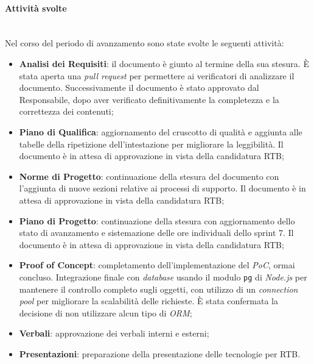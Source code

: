 \documentclass[10pt, letterpaper]{article}
\newcommand{\trisubsection}[1]{\paragraph{#1}\mbox{}\\}
\begin{document}
\trisubsection{Attività svolte}
Nel corso del periodo di avanzamento sono state svolte le seguenti attività:
\begin{itemize}
    \item \textbf{Analisi dei Requisiti}: il documento è giunto al termine della sua stesura. È stata aperta una \textit{pull request} per permettere ai verificatori di analizzare il documento. Successivamente il documento è stato approvato dal Responsabile, dopo aver verificato definitivamente la completezza e la correttezza dei contenuti;
    \item \textbf{Piano di Qualifica}: aggiornamento del cruscotto di qualità e aggiunta alle tabelle della ripetizione dell'intestazione per migliorare la leggibilità. Il documento è in attesa di approvazione in vista della candidatura RTB;
    \item \textbf{Norme di Progetto}: continuazione della stesura del documento con l'aggiunta di nuove sezioni relative ai processi di supporto. Il documento è in attesa di approvazione in vista della candidatura RTB;
    \item \textbf{Piano di Progetto}: continuazione della stesura con aggiornamento dello stato di avanzamento e sistemazione delle ore individuali dello sprint 7. Il documento è in attesa di approvazione in vista della candidatura RTB;
    \item \textbf{Proof of Concept}: completamento dell'implementazione del \textit{PoC}, ormai concluso. Integrazione finale con \textit{database} usando il modulo \texttt{pg} di \textit{Node.js} per mantenere il controllo completo sugli oggetti, con utilizzo di un \textit{connection pool} per migliorare la scalabilità delle richieste. È stata confermata la decisione di non utilizzare alcun tipo di \textit{ORM};
    \item \textbf{Verbali}: approvazione dei verbali interni e esterni;
    \item \textbf{Presentazioni}: preparazione della presentazione delle tecnologie per RTB.
\end{itemize}
\end{document}
